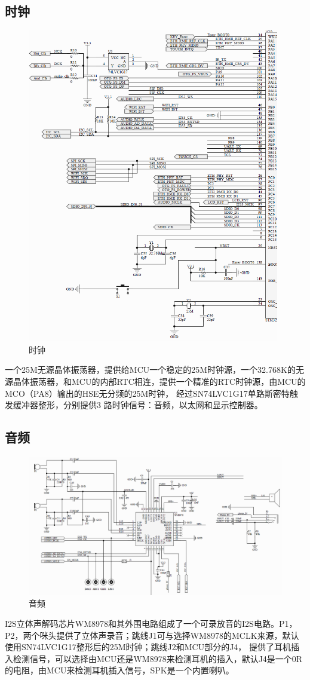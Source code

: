 \documentclass[titlepage]{article}
\begin{document}
 \subsection{时钟}
  \begin{figure}[h]
  \centering
  \includegraphics[width=11cm]{clock.png}
  \caption{时钟}
 \end{figure}
 一个25M无源晶体振荡器，提供给MCU一个稳定的25M时钟源，一个32.768K的无源晶体振荡器，和MCU的内部RTC相连，提供一个精准的RTC时钟源，由MCU的MCO（PA8）输出的HSE无分频的25M时钟，
 经过SN74LVC1G17单路斯密特触发缓冲器整形，分别提供3 路时钟信号：音频，以太网和显示控制器。
 \newpage
 \subsection{音频}
  \begin{figure}[h]
  \centering
  \includegraphics[width=15cm]{audio.png}
  \caption{音频}
 \end{figure}
 I2S立体声解码芯片WM8978和其外围电路组成了一个可录放音的I2S电路。P1，P2，两个咪头提供了立体声录音；跳线J1可与选择WM8978的MCLK来源，默认使用SN74LVC1G17整形后的25M时钟；跳线J2和MCU部分的J4，
 提供了耳机插入检测信号，可以选择由MCU还是WM8978来检测耳机的插入，默认J4是一个0R的电阻，由MCU来检测耳机插入信号，SPK是一个内置喇叭。
\end{document}
